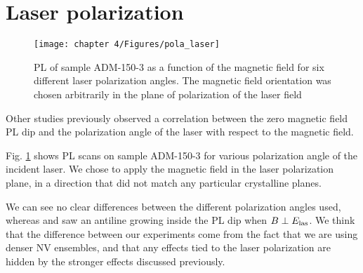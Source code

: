 \documentclass[a4paper, 11pt]{report}
\begin{document}
\section{Laser polarization}
\begin{figure}[h]
\centering
\texttt{[image: chapter 4/Figures/pola\_laser]}
\caption{PL of sample ADM-150-3 as a function of the magnetic field for six different laser polarization angles. The magnetic field orientation was chosen arbitrarily in the plane of polarization of the laser field}
\label{pola laser}
\end{figure}

Other studies \citep{anishchik2015low, filimonenko2020weak} previously observed a correlation between the zero magnetic field PL dip and the polarization angle of the laser with respect to the magnetic field. 

Fig. \ref{pola laser} shows PL scans on sample ADM-150-3 for various polarization angle of the incident laser. We chose to apply the magnetic field in the laser polarization plane, in a direction that did not match any particular crystalline planes.

We can see no clear differences between the different polarization angles used, whereas \citep{anishchik2015low} and \citep{filimonenko2020weak} saw an antiline growing inside the PL dip when $B \perp E_{\rm las}$. We think that the difference between our experiments come from the fact that we are using denser NV ensembles, and that any effects tied to the laser polarization are hidden by the stronger effects discussed previously.

\printbibliography
\end{document}
